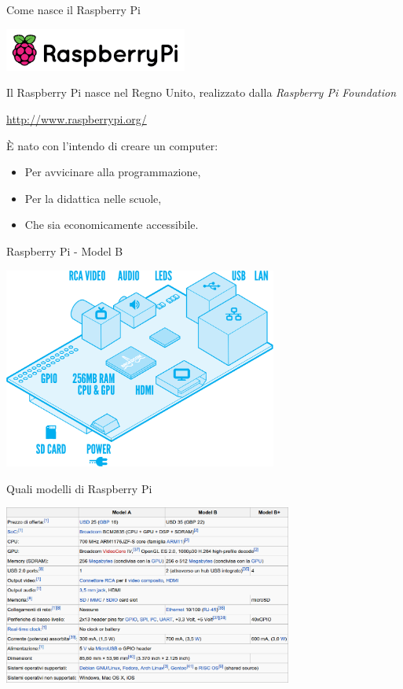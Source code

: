 \documentclass[xcolor=svgnames,11pt]{beamer}
\begin{document}
\begin{frame}{Come nasce il Raspberry Pi}
\begin{center}
\includegraphics[width=6cm]{logo_raspi.png}
\end{center}
\pause

Il Raspberry Pi nasce nel Regno Unito, realizzato dalla \emph{Raspberry Pi Foundation}

\begin{center}
\url{http://www.raspberrypi.org/}
\end{center}

\pause
\medskip

\begin{block}{}
\`E nato con l'intendo di creare un computer:
\pause
\begin{itemize}
\item Per avvicinare alla programmazione,
\pause
\item Per la didattica nelle scuole,
\pause
\item Che sia economicamente accessibile.
\end{itemize}
\end{block}
\end{frame}

\begin{frame}{Raspberry Pi - Model B}
\begin{center}
\includegraphics[width=9cm]{scheme.png}
\end{center}
\end{frame}

\begin{frame}{Quali modelli di Raspberry Pi}
\begin{center}
\includegraphics[width=9.5cm]{table.png}
\end{center}
\end{frame}
\end{document}
